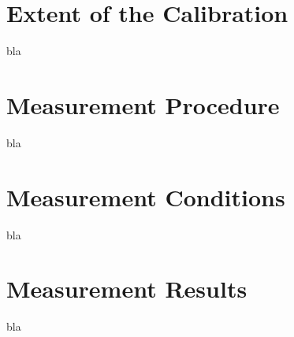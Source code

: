 \documentclass[data]{ecertificate}
\begin{document}
\maketitle

\section*{Extent of the Calibration}
bla

\section*{Measurement Procedure}
bla

\section*{Measurement Conditions}
bla

\section*{Measurement Results}
bla

\uncsection
\end{document}
